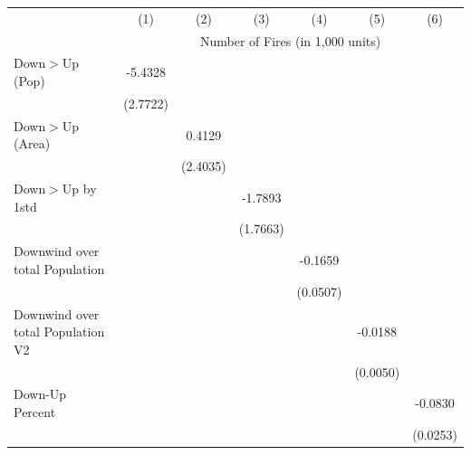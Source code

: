 \begin{tabular}{lcccccc}
\hline
& (1) & (2) & (3) & (4) & (5) & (6)\\
& \multicolumn{6}{c}{Number of Fires (in 1,000 units) }\\
\hline

Down$>$Up (Pop)&     -5.4328\sym{*}  &                     &                     &                     &                     &                     \\
            &    (2.7722)         &                     &                     &                     &                     &                     \\
Down$>$Up (Area)&                     &      0.4129         &                     &                     &                     &                     \\
            &                     &    (2.4035)         &                     &                     &                     &                     \\
Down$>$Up by 1std&                     &                     &     -1.7893         &                     &                     &                     \\
            &                     &                     &    (1.7663)         &                     &                     &                     \\
Downwind over total Population&                     &                     &                     &     -0.1659\sym{***}&                     &                     \\
            &                     &                     &                     &    (0.0507)         &                     &                     \\
Downwind over total Population V2&                     &                     &                     &                     &     -0.0188\sym{***}&                     \\
            &                     &                     &                     &                     &    (0.0050)         &                     \\
Down-Up Percent&                     &                     &                     &                     &                     &     -0.0830\sym{***}\\
            &                     &                     &                     &                     &                     &    (0.0253)         \\
\hline

\end{tabular}
